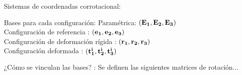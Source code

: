 \documentclass[
  aspectratio=169,
]{beamer}
\begin{document}
\begin{small}
\begin{frame}{Sistemas de coordenadas corrotacional:}{}
	\begin{minipage}[t]{0.5\linewidth}
		\begin{figure}[htbp]
			\centering
			\def\svgwidth{60mm}
			
		\end{figure}
	\end{minipage}\hfill
	\begin{minipage}[t]{0.5\linewidth}
		\begin{block}{Bases para cada configuración:}
			Paramétrica: $(\bf{E_1},\bf{E_2},\bf{E_3})$\\
			{\color{blue}Configuración de referencia} : $(\bf{e_1},\bf{e_2},\bf{e_3})$\\
			{\color{gray}Configuración de deformación rígida} : $(\bf{r_1},\bf{r_2},\bf{r_3})$\\
			{\color{orange}Configuración deformada} :  $(\bf{t_1^i},\bf{t_2^i},\bf{t_3^i})$\\
		\end{block}
		\begin{block}{¿Cómo se vinculan las bases? :}
			Se definen las siguientes matrices de rotación...
		\end{block}
	\end{minipage}	
\end{frame}


\end{small}
\end{document}
